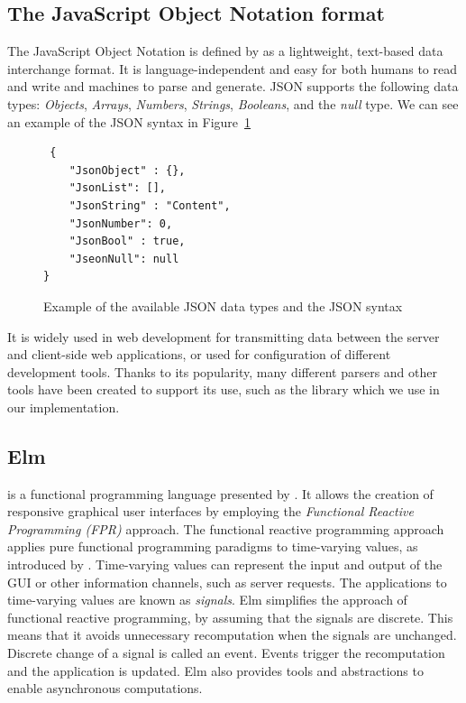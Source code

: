 \subsection{The JavaScript Object Notation format}
The JavaScript Object Notation is defined by \citet{rfc8259} as a lightweight, text-based data interchange format.
It is language-independent and easy for both humans to read and write and machines to parse and generate.
JSON supports the following data types: \emph{Objects}, \emph{Arrays}, \emph{Numbers}, \emph{Strings}, \emph{Booleans}, and the \emph{null} type.
We can see an example of the JSON syntax in Figure~\ref{fig:json-example}

\begin{figure}[htbp]
	\caption {Example of the available JSON data types and the JSON syntax}
	\label{fig:json-example}
	\begin{lstlisting}
 { 
    "JsonObject" : {},
    "JsonList": [],
    "JsonString" : "Content",
    "JsonNumber": 0,
    "JsonBool" : true,
    "JseonNull": null
}
  \end{lstlisting}
\end{figure}

It is widely used in web development for transmitting data between the server and client-side web applications,
or used for configuration of different development tools.
Thanks to its popularity, many different parsers and other tools have been created to support its use, such as the \citet{simpleJson} library which we use in our implementation.

\subsection{Elm}
\citet{eml} is a functional programming language presented by \citet{Czaplicki_Chong_2013}.
It allows the creation of responsive graphical user interfaces by employing the
\emph{Functional Reactive Programming (FPR)} approach.
The functional reactive programming approach applies pure functional programming paradigms to time-varying values, as introduced by \citet{Elliott_Hudak_1997}.
Time-varying values can represent the input and output of the GUI or other information
channels, such as server requests. The applications to time-varying values are known
as \emph{signals}. Elm simplifies the approach of functional reactive programming,
by assuming that the signals are discrete. This means that it avoids unnecessary
recomputation when the signals are unchanged. Discrete change of a signal is called
an event. Events trigger the recomputation and the application is updated. Elm also
provides tools and abstractions to enable asynchronous computations.

